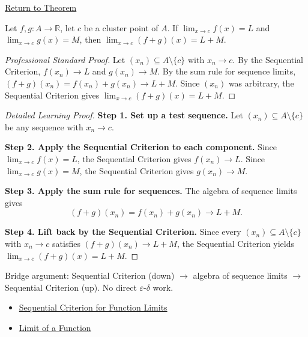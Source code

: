 \newpage
{}
\label{prf:limit-sum}

\begin{remark*}[Return]
\hyperref[thm:limit-sum]{Return to Theorem}
\end{remark*}

\begin{theorem*}
Let $f, g : A \to \mathbb{R}$, let $c$ be a cluster point of $A$. If
$\lim_{x\to c}f(x)=L$ and $\lim_{x\to c}g(x)=M$, then
$\lim_{x\to c}(f+g)(x) = L+M$.
\end{theorem*}

\begin{proof}[Professional Standard Proof]
\LRAProofBodyStart
Let $(x_n) \subseteq A \setminus \{c\}$ with $x_n \to c$.
By the Sequential Criterion, $f(x_n) \to L$ and $g(x_n) \to M$.
By the sum rule for sequence limits, $(f+g)(x_n) = f(x_n)+g(x_n) \to L+M$.
Since $(x_n)$ was arbitrary, the Sequential Criterion gives
$\lim_{x\to c}(f+g)(x) = L+M$.
\end{proof}

\begin{proof}[Detailed Learning Proof]
\LRAProofBodyStart
\textbf{Step 1. Set up a test sequence.}
Let $(x_n) \subseteq A \setminus \{c\}$ be any sequence with $x_n \to c$.

\textbf{Step 2. Apply the Sequential Criterion to each component.}
Since $\lim_{x\to c}f(x)=L$, the Sequential Criterion gives $f(x_n) \to L$.
Since $\lim_{x\to c}g(x)=M$, the Sequential Criterion gives $g(x_n) \to M$.

\textbf{Step 3. Apply the sum rule for sequences.}
The algebra of sequence limits gives
\[
  (f+g)(x_n) = f(x_n)+g(x_n) \to L+M.
\]

\textbf{Step 4. Lift back by the Sequential Criterion.}
Since every $(x_n) \subseteq A \setminus \{c\}$ with $x_n \to c$ satisfies
$(f+g)(x_n) \to L+M$, the Sequential Criterion yields
$\lim_{x\to c}(f+g)(x) = L+M$.
\end{proof}

\begin{remark*}
Bridge argument: Sequential Criterion (down) $\to$ algebra of sequence limits
$\to$ Sequential Criterion (up). No direct $\varepsilon$-$\delta$ work.
\end{remark*}

\begin{remark*}[Dependencies]
\begin{itemize}
  \item \hyperref[prop:sequential-criterion-limits]{Sequential Criterion for Function Limits}
  \item \hyperref[def:limit-function]{Limit of a Function}
\end{itemize}
\end{remark*}

\clearpage

